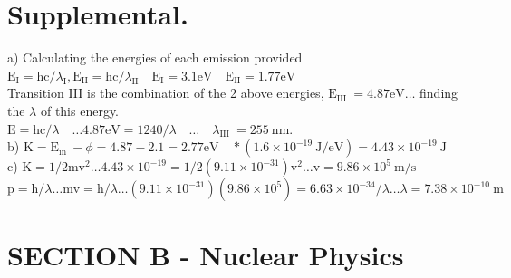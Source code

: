 \begin{enumerate}
\section*{Supplemental.}
a) Calculating the energies of each emission provided\\
$\mathrm{E}_{\mathrm{I}}=\mathrm{hc} / \lambda_{\mathrm{I}}, \mathrm{E}_{\mathrm{II}}=\mathrm{hc} / \lambda_{\mathrm{II}} \quad \mathrm{E}_{\mathrm{I}}=3.1 \mathrm{eV} \quad \mathrm{E}_{\mathrm{II}}=1.77 \mathrm{eV}$\\
Transition III is the combination of the 2 above energies, $\mathrm{E}_{\text {III }}=4.87 \mathrm{eV} \ldots$ finding the $\lambda$ of this energy.\\
$\mathrm{E}=\mathrm{hc} / \lambda \quad \ldots 4.87 \mathrm{eV}=1240 / \lambda \quad \ldots \quad \lambda_{\text {III }}=255 \mathrm{~nm}$.\\
b) $\mathrm{K}=\mathrm{E}_{\text {in }}-\phi=4.87-2.1=2.77 \mathrm{eV} \quad *\left(1.6 \times 10^{-19} \mathrm{~J} / \mathrm{eV}\right)=4.43 \times 10^{-19} \mathrm{~J}$\\
c) $\mathrm{K}=1 / 2 \mathrm{mv}^{2} \ldots 4.43 \times 10^{-19}=1 / 2\left(9.11 \times 10^{-31}\right) \mathrm{v}^{2} \ldots \mathrm{v}=9.86 \times 10^{5} \mathrm{~m} / \mathrm{s}$\\
$\mathrm{p}=\mathrm{h} / \lambda \ldots \mathrm{mv}=\mathrm{h} / \lambda \ldots\left(9.11 \times 10^{-31}\right)\left(9.86 \times 10^{5}\right)=6.63 \times 10^{-34} / \lambda \ldots \lambda=7.38 \times 10^{-10} \mathrm{~m}$

\section*{SECTION B - Nuclear Physics}

\end{enumerate}
